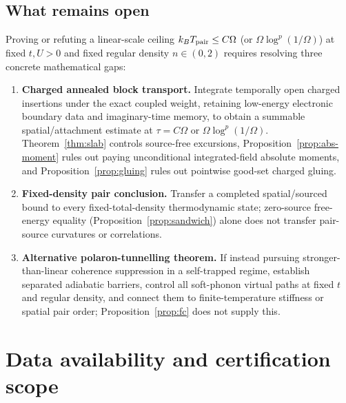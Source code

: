 \documentclass[11pt]{article}
\theoremstyle{remark}
\begin{document}
\subsection*{What remains open}

Proving or refuting a linear-scale ceiling $k_BT_{\rm pair}\le C\Omega$ (or $\Omega\log^p(1/\Omega)$) at fixed $t,U>0$ and fixed regular density $n\in(0,2)$ requires resolving three concrete mathematical gaps:
\begin{enumerate}
\item \textbf{Charged annealed block transport.} Integrate temporally open charged insertions under the exact coupled weight, retaining low-energy electronic boundary data and imaginary-time memory, to obtain a summable spatial/attachment estimate at $\tau=C\Omega$ or $\Omega\log^p(1/\Omega)$. Theorem~\ref{thm:slab} controls source-free excursions, Proposition~\ref{prop:abs-moment} rules out paying unconditional integrated-field absolute moments, and Proposition~\ref{prop:gluing} rules out pointwise good-set charged gluing.
\item \textbf{Fixed-density pair conclusion.} Transfer a completed spatial/sourced bound to every fixed-total-density thermodynamic state; zero-source free-energy equality (Proposition~\ref{prop:sandwich}) alone does not transfer pair-source curvatures or correlations.
\item \textbf{Alternative polaron-tunnelling theorem.} If instead pursuing stronger-than-linear coherence suppression in a self-trapped regime, establish separated adiabatic barriers, control all soft-phonon virtual paths at fixed $t$ and regular density, and connect them to finite-temperature stiffness or spatial pair order; Proposition~\ref{prop:fc} does not supply this.
\end{enumerate}

\section*{Data availability and certification scope}
\end{document}
